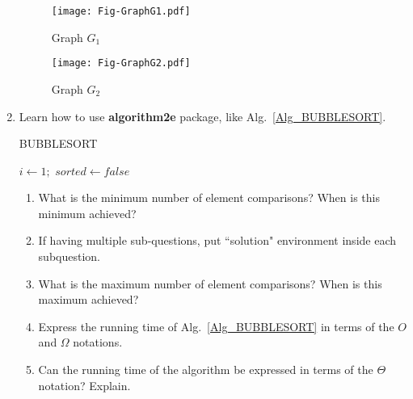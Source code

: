 \documentclass[12pt,a4paper]{article}
\makeatletter
\newtheorem*{solution}{Solution}
\theoremstyle{definition}
\renewenvironment{solution}[1][Solution] {\par\pushQED{\qed}\normalfont\topsep6\p@\@plus6\p@\relax\trivlist\item[\hskip\labelsep\bfseries#1\@addpunct{.}]\ignorespaces}{\popQED\endtrivlist\@endpefalse} \makeatother
\makeatother
\begin{document}
\begin{enumerate}
\begin{figure}[htbp]
\begin{minipage}[h]{0.45\textwidth}
\centering
\texttt{[image: Fig-GraphG1.pdf]}
\caption{Graph $G_1$} \label{Fig-G1}
\end{minipage}
\hspace{5mm}
\begin{minipage}[h]{0.45\textwidth}
\centering
\texttt{[image: Fig-GraphG2.pdf]}
\caption{Graph $G_2$} \label{Fig-G2}
\end{minipage}
\end{figure}

\item Learn how to use \textbf{algorithm2e} package, like Alg.~\ref{Alg_BUBBLESORT}.

\begin{minipage}[t]{0.9\textwidth}
\begin{algorithm}[H]
	\BlankLine
	\caption{BUBBLESORT}\label{Alg_BUBBLESORT}
	\BlankLine
	$i\leftarrow 1;$ $sorted\leftarrow false$\;
	
\end{algorithm}
\end{minipage}
\hspace{2mm}

\begin{enumerate}
	\item What is the minimum number of element comparisons? When is this minimum achieved?
    \begin{solution}
        If having multiple sub-questions, put ``solution" environment inside each subquestion.
    \end{solution}
	
	\item What is the maximum number of element comparisons? When is this maximum achieved?
	
	\item Express the running time of Alg.~\ref{Alg_BUBBLESORT} in terms of the $O$ and $\Omega$ notations.
	
	\item Can the running time of the algorithm be expressed in terms of the
	$\Theta$ notation? Explain.
\end{enumerate}
\end{enumerate}
\end{document}
